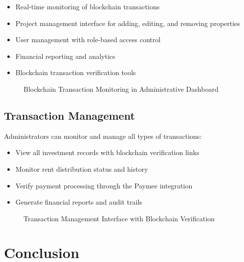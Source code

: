 \begin{itemize}
    \item Real-time monitoring of blockchain transactions
    \item Project management interface for adding, editing, and removing properties
    \item User management with role-based access control
    \item Financial reporting and analytics
    \item Blockchain transaction verification tools
\end{itemize}

\begin{figure}[htbp]
  \centering
  \caption{Blockchain Transaction Monitoring in Administrative Dashboard}
  \label{fig:admin-dashboard}
\end{figure}

\subsection{Transaction Management}

Administrators can monitor and manage all types of transactions:

\begin{itemize}
    \item View all investment records with blockchain verification links
    \item Monitor rent distribution status and history
    \item Verify payment processing through the Paymee integration
    \item Generate financial reports and audit trails
\end{itemize}

\begin{figure}[htbp]
  \centering
  \caption{Transaction Management Interface with Blockchain Verification}
  \label{fig:transaction-management}
\end{figure}

\section*{Conclusion}

